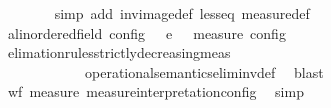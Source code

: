 \begin{isabellebody}
\ \ \ \ \ \ \isamarkupfalse%
\ {\isacharparenleft}simp\ add{\isacharcolon}\ inv{\isacharunderscore}image{\isacharunderscore}def\ less{\isacharunderscore}eq\ measure{\isacharunderscore}def{\isacharparenright}\isanewline
\ \ \ \ \isamarkupfalse%
\ {\isacartoucheopen}{\isacharbraceleft}{\isacharparenleft}{\isacharparenleft}{\isasymS}a{\isacharcolon}{\isacharcolon}linordered{\isacharunderscore}field\ config{\isacharparenright}{\isacharcomma}\ {\isasymS}\ {\isasymS}\ {\isasymhookrightarrow}\isactrlsub e\isactrlsup {\isasymleftarrow}\ {\isasymS}\ {\isasymsubseteq}\ {\isacharparenleft}measure\ {\isasymmu}\isactrlsub c\isactrlsub o\isactrlsub n\isactrlsub f\isactrlsub i\isactrlsub g{\isacharparenright}{\isacartoucheclose}\isanewline
\ \ \ \ \ \ \isamarkupfalse%
\ elimation{\isacharunderscore}rules{\isacharunderscore}strictly{\isacharunderscore}decreasing{\isacharunderscore}meas{\isacharprime}\isanewline
\ \ \ \ \ \ \ \ \ \ \ \ operational{\isacharunderscore}semantics{\isacharunderscore}elim{\isacharunderscore}inv{\isacharunderscore}def\ \isamarkupfalse%
\ blast\isanewline
\ \ \isamarkupfalse%
\isanewline
\ \ \ \ \isamarkupfalse%
\ {\isacartoucheopen}wf\ {\isacharparenleft}measure\ measure{\isacharunderscore}interpretation{\isacharunderscore}config{\isacharparenright}{\isacartoucheclose}\ \isamarkupfalse%
\ simp\isanewline
\ \ \isamarkupfalse%
\isanewline
{}\isamarkupfalse%
%
\endisatagproof
{\isafoldproof}%
%
\isadelimproof
\isanewline
%
\endisadelimproof
\isanewline
%
\isadelimtheory
\isanewline
%
\endisadelimtheory
%
\isatagtheory
{}\isamarkupfalse%
%
\endisatagtheory
{\isafoldtheory}%
%
\isadelimtheory
%
\endisadelimtheory
%
\end{isabellebody}%
\endinput
